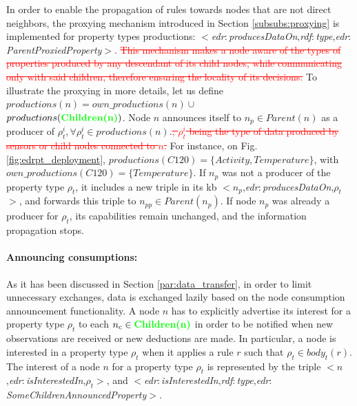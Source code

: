 \documentclass{iosart2c}
\newcommand{\added}[1]{\textcolor{green}{\textbf{#1}}}
\newcommand{\removed}[1]{\textcolor{red}{\sout{#1}}}
\newcommand{\namespace}[1]{\textit{#1$:$}}
\newcommand{\concept}[2]{\namespace{#1}\-\textit{#2}}
\newcommand{\triplet}[3]{$<$#1,\textit{#2},#3$>$}
\begin{document}
In order to enable the propagation of rules towards nodes that are not direct neighbors, the proxying mechanism introduced in Section \textsection \ref{subsubs:proxying} is implemented for property types productions: \triplet{\concept{edr}{produces\-Data\-On}}{\concept{rdf}{type}}{\concept{edr}{Parent\-Proxied\-Property}}.
\removed{This mechanism makes a node aware of the types of properties produced by any descendant of its child nodes, while communicating only with said children, therefore ensuring the locality of its decisions.}
To illustrate the proxying in more details, let us define $productions(n)=own\_productions(n)\cup$\\$productions(\added{Children(n)})$. 
Node $n$ announces itself to $n_{p}\in Parent(n)$ as a producer of $\rho^{i}_t, \forall \rho^{i}_t\in productions(n)$.\removed{, $\rho^{i}_t$ being the type of data produced by sensors or child nodes connected to $n$.}
For instance, on Fig. \ref{fig:edrpt_deployment}, $productions(C120) = \{Activity, Temperature\}$, with\\$own\_productions(C120) = \{Temperature\}$.
If $n_{p}$ was not a producer of the property type $\rho_t$, it includes a new triple in its \gls{kb} \triplet{$n_{p}$}{\concept{edr}{produces\-Data\-On}}{$\rho_t$}, and forwards this triple to $n_{pp}\in Parent(n_p)$.
If node $n_{p}$ was already a producer for $\rho_t$, its capabilities remain unchanged, and the information propagation stops.

\paragraph{Announcing consumptions:}
As it has been discussed in Section \textsection \ref{par:data_transfer}, in order to limit unnecessary exchanges, data is exchanged lazily based on the node consumption announcement functionality.
A node $n$ has to explicitly advertise its interest for a property type $\rho_{t}$ to each $n_c\in \added{Children(n)}$ in order to be notified when new observations are received or new deductions are made. 
In particular, a node is interested in a property type $\rho_{t}$ when it applies a rule $r$ such that $\rho_{t}\in body_t(r)$. 
The interest of a node $n$ for a property type $\rho_t$ is represented by the triple \triplet{$n$}{\concept{edr}{is\-Interested\-In}}{$\rho_t$}, and \triplet{\concept{edr}{is\-Interested\-In}}{\concept{rdf}{type}}{\concept{edr}{Some\-Children\-Announced\-Property}}.
\end{document}
